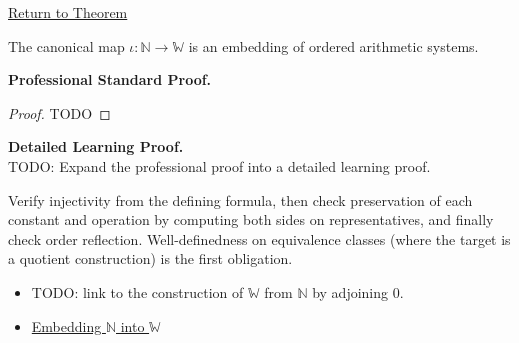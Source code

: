\newpage
{}
\label{prf:n-embeds-in-w}

\begin{remark*}[Return]
\hyperref[thm:n-embeds-in-w]{Return to Theorem}
\end{remark*}

\begin{theorem*}
The canonical map $\iota:\mathbb{N}\to \mathbb{W}$ is an embedding of ordered arithmetic systems.
\end{theorem*}

\textbf{Professional Standard Proof.}~\\
\begin{proof}
TODO
\end{proof}

\textbf{Detailed Learning Proof.}~\\
TODO: Expand the professional proof into a detailed learning proof.

\begin{remark*}
Verify injectivity from the defining formula, then check preservation of each constant and operation by computing both sides on representatives, and finally check order reflection. Well-definedness on equivalence classes (where the target is a quotient construction) is the first obligation.
\end{remark*}

\begin{dependencies}
\begin{itemize}
  \item TODO: link to the construction of $\mathbb{W}$ from $\mathbb{N}$ by adjoining $0$.
  \item \hyperref[def:embedding-n-into-w]{Embedding $\mathbb{N}$ into $\mathbb{W}$}
\end{itemize}
\end{dependencies}
